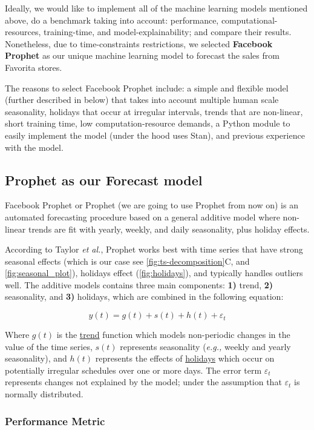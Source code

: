 Ideally, we would like to implement all of the  machine learning models mentioned above, do a benchmark taking into account: performance, computational-resources, training-time, and model-explainability; and compare their results. Nonetheless, due to time-constraints restrictions, we selected \textbf{Facebook Prophet} as our unique machine learning model to forecast the sales from Favorita stores.

 The reasons to select Facebook Prophet include: a simple and flexible model (further described in below) that takes into account multiple human scale seasonality, holidays that occur at irregular intervals, trends that are non-linear, short training time, low computation-resource demands, a Python module to easily implement the model (under the hood uses Stan), and previous experience with the model. 


\subsection[Prophet as our Forecast model]{Prophet as our Forecast model}
\label{sec:forecast_model}

Facebook Prophet or Prophet (we are going to use Prophet from now on) is an automated forecasting procedure based on a general additive model where non-linear trends are fit with yearly, weekly, and daily seasonality, plus holiday effects.

According to Taylor \textit{et al.}, Prophet works best with time series that have strong seasonal effects (which is our case see \autoref{fig:ts-decomposition}C, and \autoref{fig:seasonal_plot}), holidays effect (\autoref{fig:holidays}), and typically handles outliers well. The additive models contains three main components: \textbf{1)} trend, \textbf{2)} seasonality, and \textbf{3)} holidays, which are combined in the following equation:

\[ y(t)= g(t) + s(t) + h(t) + \varepsilon_t  \]

Where $g(t)$ is the \underline{trend} function which models non-periodic changes in the value of the time series, $s(t)$ represents seasonality (\textit{e.g.,} weekly and yearly seasonality), and $h(t)$ represents the effects of \underline{holidays} which occur on potentially irregular schedules over one or more days. The error term $\varepsilon_t$ represents changes not explained by the model; under the assumption that $\varepsilon_t$ is normally distributed.

\subsubsection[Performance Metric]{Performance Metric}
\label{sec:error}

